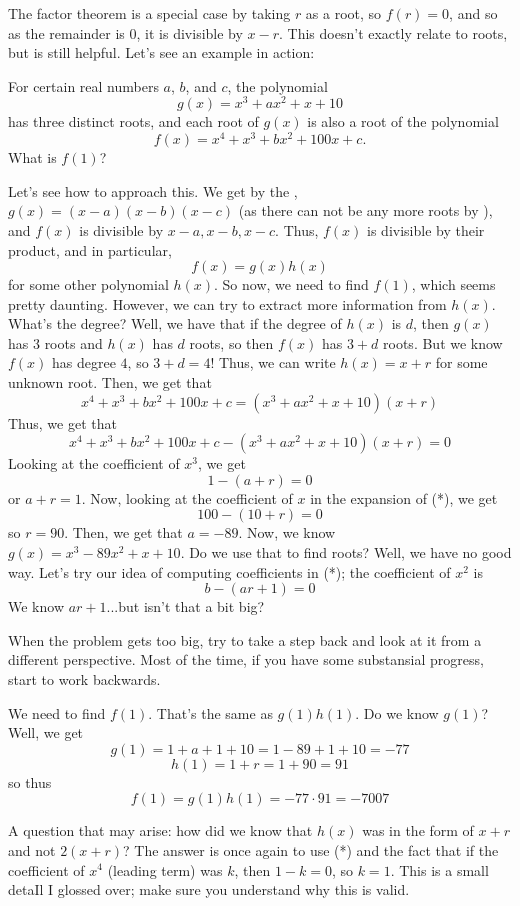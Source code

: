 \documentclass[11pt,titlepage]{scrartcl}
\begin{document}
The factor theorem is a special case by taking $r$ as a root, so $f(r)=0$, and so as the remainder is $0$, it is divisible by $x-r$. This doesn't exactly relate to roots, but is still helpful. Let's see an example in action:
\begin{example}
For certain real numbers $a$, $b$, and $c$, the polynomial \[g(x) = x^3 + ax^2 + x + 10\]has three distinct roots, and each root of $g(x)$ is also a root of the polynomial \[f(x) = x^4 + x^3 + bx^2 + 100x + c.\]What is $f(1)$?
\end{example}
Let's see how to approach this. We get by the , $g(x)=(x-a)(x-b)(x-c)$ (as there can not be any more roots by ), and $f(x)$ is divisible by $x-a,x-b,x-c$. Thus, $f(x)$ is divisible by their product, and in particular,
\[f(x)=g(x)h(x)\]
for some other polynomial $h(x)$. So now, we need to find $f(1)$, which seems pretty daunting. However, we can try to extract more information from $h(x)$. What's the degree? Well, we have that if the degree of $h(x)$ is $d$, then $g(x)$ has $3$ roots and $h(x)$ has $d$ roots, so then $f(x)$ has $3+d$ roots. But we know $f(x)$ has degree $4$, so $3+d=4$! Thus, we can write $h(x)=x+r$ for some unknown root. Then, we get that
\[x^4+x^3+bx^2+100x+c=(x^3+ax^2+x+10)(x+r)\]
Thus, we get that
\[x^4+x^3+bx^2+100x+c-(x^3+ax^2+x+10)(x+r)=0\tag{*}\]
Looking at the coefficient of $x^3$, we get
\[1-(a+r)=0\]
or $a+r=1$. Now, looking at the coefficient of $x$ in the expansion of (*), we get
\[100-(10+r)=0\]
so $r=90$. Then, we get that $a=-89$. Now, we know $g(x)=x^3-89x^2+x+10$. Do we use that to find roots? Well, we have no good way. Let's try our idea of computing coefficients in (*); the coefficient of $x^2$ is
\[b-(ar+1)=0\]
We know $ar+1$...but isn't that a bit big?
\begin{remark}
When the problem gets too big, try to take a step back and look at it from a different perspective. Most of the time, if you have some substansial progress, start to work backwards.
\end{remark}
We need to find $f(1)$. That's the same as $g(1)h(1)$. Do we know $g(1)$? Well, we get
\[g(1)=1+a+1+10=1-89+1+10=-77\]
\[h(1)=1+r=1+90=91\]
so thus
\[f(1)=g(1)h(1)=-77\cdot 91=\boxed{-7007}\]
\begin{remark}
A question that may arise: how did we know that $h(x)$ was in the form of $x+r$ and not $2(x+r)$? The answer is once again to use (*) and the fact that if the coefficient of $x^4$ (leading term) was $k$, then $1-k=0$, so $k=1$. This is a small detaIl I glossed over; make sure you understand why this is valid.
\end{remark}
\end{document}
